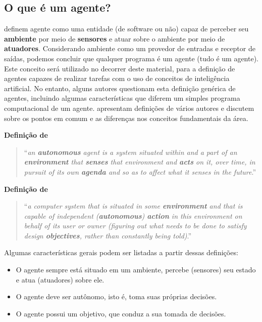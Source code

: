 \subsection{O que é um agente?}

\citet{RusselAndNorvig2010} definem agente como uma entidade (de software ou não) capaz de perceber seu \textbf{ambiente} por meio de \textbf{sensores} e atuar sobre o ambiente por meio de \textbf{atuadores}. Considerando ambiente como um provedor de entradas e receptor de saídas, podemos concluir que qualquer programa é um agente (tudo é um agente). Este conceito será utilizado no decorrer deste material, para a definição de agentes capazes de realizar tarefas com o uso de conceitos de inteligência artificial. No entanto, alguns autores questionam esta definição genérica de agentes, incluindo algumas características que diferem um simples programa computacional de um agente. \citet{FranklinAndGraesser1996} apresentam definições de vários autores e discutem sobre os pontos em comum e as diferenças nos conceitos fundamentais da área.

\textbf{Definição de \citet{FranklinAndGraesser1996}}
\begin{quotation}
``\textit{an \textbf{autonomous} agent is a system situated within and a part of an \textbf{environment} that \textbf{senses} that environment and \textbf{acts} on it, over time, in pursuit of its own \textbf{agenda} and so as to affect what it senses in the future}.''
\end{quotation}

\insertspace

\textbf{Definição de \citet{Wooldridge2009}}
\begin{quotation}
``\textit{a computer system that is situated in some \textbf{environment} and that is capable of independent (\textbf{autonomous}) \textbf{action} in this environment on behalf of its user or owner (figuring out what needs to be done to satisfy design \textbf{objectives}, rather than constantly being told)}.''
\end{quotation}

\insertspace

Algumas características gerais podem ser listadas a partir dessas definições:

\begin{itemize}
	\item O agente sempre está situado em um ambiente, percebe (sensores) seu estado e atua (atuadores) sobre ele.
	\item O agente deve ser autônomo, isto é, toma suas próprias decisões.
	\item O agente possui um objetivo, que conduz a sua tomada de decisões.
\end{itemize}

